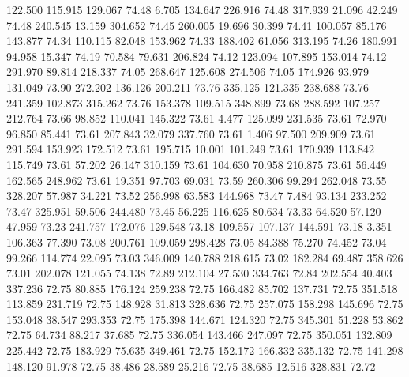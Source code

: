  122.500  115.915  129.067        74.48
   6.705  134.647  226.916        74.48
 317.939   21.096   42.249        74.48
 240.545   13.159  304.652        74.45
 260.005   19.696   30.399        74.41
 100.057   85.176  143.877        74.34
 110.115   82.048  153.962        74.33
 188.402   61.056  313.195        74.26
 180.991   94.958   15.347        74.19
  70.584   79.631  206.824        74.12
 123.094  107.895  153.014        74.12
 291.970   89.814  218.337        74.05
 268.647  125.608  274.506        74.05
 174.926   93.979  131.049        73.90
 272.202  136.126  200.211        73.76
 335.125  121.335  238.688        73.76
 241.359  102.873  315.262        73.76
 153.378  109.515  348.899        73.68
 288.592  107.257  212.764        73.66
  98.852  110.041  145.322        73.61
   4.477  125.099  231.535        73.61
  72.970   96.850   85.441        73.61
 207.843   32.079  337.760        73.61
   1.406   97.500  209.909        73.61
 291.594  153.923  172.512        73.61
 195.715   10.001  101.249        73.61
 170.939  113.842  115.749        73.61
  57.202   26.147  310.159        73.61
 104.630   70.958  210.875        73.61
  56.449  162.565  248.962        73.61
  19.351   97.703   69.031        73.59
 260.306   99.294  262.048        73.55
 328.207   57.987   34.221        73.52
 256.998   63.583  144.968        73.47
   7.484   93.134  233.252        73.47
 325.951   59.506  244.480        73.45
  56.225  116.625   80.634        73.33
  64.520   57.120   47.959        73.23
 241.757  172.076  129.548        73.18
 109.557  107.137  144.591        73.18
   3.351  106.363   77.390        73.08
 200.761  109.059  298.428        73.05
  84.388   75.270   74.452        73.04
  99.266  114.774   22.095        73.03
 346.009  140.788  218.615        73.02
 182.284   69.487  358.626        73.01
 202.078  121.055   74.138        72.89
 212.104   27.530  334.763        72.84
 202.554   40.403  337.236        72.75
  80.885  176.124  259.238        72.75
 166.482   85.702  137.731        72.75
 351.518  113.859  231.719        72.75
 148.928   31.813  328.636        72.75
 257.075  158.298  145.696        72.75
 153.048   38.547  293.353        72.75
 175.398  144.671  124.320        72.75
 345.301   51.228   53.862        72.75
  64.734   88.217   37.685        72.75
 336.054  143.466  247.097        72.75
 350.051  132.809  225.442        72.75
 183.929   75.635  349.461        72.75
 152.172  166.332  335.132        72.75
 141.298  148.120   91.978        72.75
  38.486   28.589   25.216        72.75
  38.685   12.516  328.831        72.72
